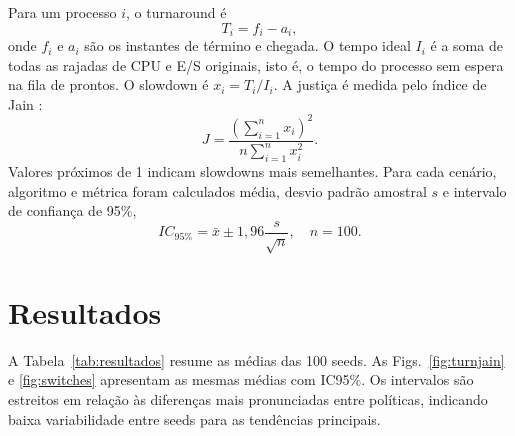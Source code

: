 \documentclass[conference]{IEEEtran}
\begin{document}
Para um processo $i$, o turnaround é
\begin{equation}
T_i=f_i-a_i,
\end{equation}
onde $f_i$ e $a_i$ são os instantes de término e chegada. O tempo ideal $I_i$ é a soma de todas as rajadas de CPU e E/S originais, isto é, o tempo do processo sem espera na fila de prontos. O slowdown é $x_i=T_i/I_i$. A justiça é medida pelo índice de Jain \cite{jain}:
\begin{equation}
J=\frac{\left(\sum_{i=1}^{n}x_i\right)^2}{n\sum_{i=1}^{n}x_i^2}.
\label{eq:jain}
\end{equation}
Valores próximos de 1 indicam slowdowns mais semelhantes. Para cada cenário, algoritmo e métrica foram calculados média, desvio padrão amostral $s$ e intervalo de confiança de 95\%,
\begin{equation}
IC_{95\%}=\bar{x}\pm1{,}96\frac{s}{\sqrt{n}}, \quad n=100.
\end{equation}

\section{Resultados}
A Tabela~\ref{tab:resultados} resume as médias das 100 seeds. As Figs.~\ref{fig:turnjain} e \ref{fig:switches} apresentam as mesmas médias com IC95\%. Os intervalos são estreitos em relação às diferenças mais pronunciadas entre políticas, indicando baixa variabilidade entre seeds para as tendências principais.
\end{document}
